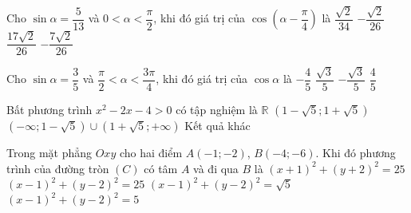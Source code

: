 \begin{ex}%
Cho $\sin \alpha =\dfrac{5}{13}$ và $0<\alpha <\dfrac{\pi}{2}$, khi đó giá trị của $\cos \left(\alpha -\dfrac{\pi}{4}\right)$ là
\choice
{$\dfrac{\sqrt{2}}{34}$}
{$-\dfrac{\sqrt{2}}{26}$}
{\True $\dfrac{17\sqrt{2}}{26}$}
{$-\dfrac{7\sqrt{2}}{26}$}
\end{ex}


\begin{ex}%
Cho $\sin \alpha =\dfrac{3}{5}$ và $\dfrac{\pi}{2}<\alpha <\dfrac{3\pi}{4}$, khi đó giá trị của $\cos\alpha $ là
\choice
{\True $-\dfrac{4}{5}$}
{$\dfrac{\sqrt{3}}{5}$}
{$-\dfrac{\sqrt{3}}{5}$}
{$\dfrac{4}{5}$}
\end{ex}


\begin{ex}%
Bất phương trình $x^2-2x-4>0$ có tập nghiệm là
\choice
{$\mathbb{R}$}
{$(1-\sqrt{5};1+\sqrt{5})$}
{\True $\left(-\infty;1-\sqrt{5}\right)\cup \left(1+\sqrt{5};+\infty\right)$}
{Kết quả khác}
\end{ex}

\begin{ex}%
Trong mặt phẳng $Oxy$ cho hai điểm $A(-1;-2)$, $B(-4;-6)$. Khi đó phương trình của đường tròn $(C)$ có tâm $A$ và đi qua $B$ là
\choice
{\True $(x+1)^2+(y+2)^2=25$}
{$(x-1)^2+(y-2)^2=25$}
{$(x-1)^2+(y-2)^2=\sqrt{5}$}
{$(x-1)^2+(y-2)^2=5$}
\end{ex}

